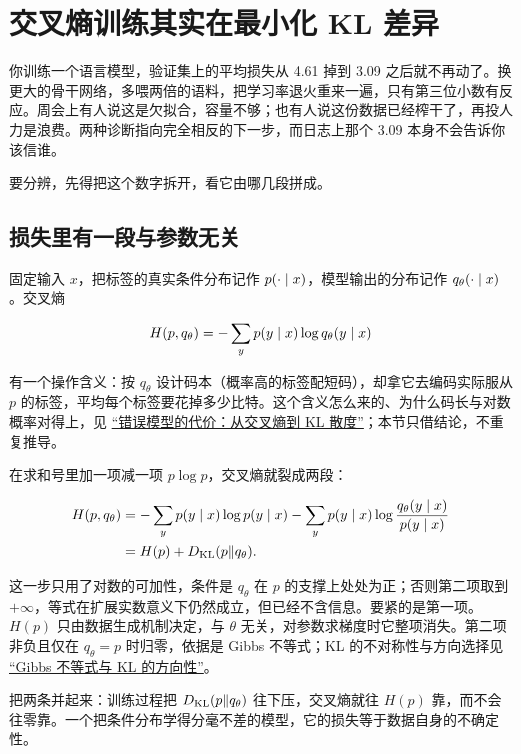 \section{交叉熵训练其实在最小化 KL 差异}
\label{sec:13-Machine-Learning/11-Information-Theoretic-Learning/01}

你训练一个语言模型，验证集上的平均损失从 4.61 掉到 3.09 之后就不再动了。换更大的骨干网络，多喂两倍的语料，把学习率退火重来一遍，只有第三位小数有反应。周会上有人说这是欠拟合，容量不够；也有人说这份数据已经榨干了，再投人力是浪费。两种诊断指向完全相反的下一步，而日志上那个 3.09 本身不会告诉你该信谁。

要分辨，先得把这个数字拆开，看它由哪几段拼成。

\subsection{损失里有一段与参数无关}

固定输入 \(x\)，把标签的真实条件分布记作 \(p(\cdot\mid x)\)，模型输出的分布记作 \(q_\theta(\cdot\mid x)\)。交叉熵

\[
H(p,q_\theta)=-\sum_y p(y\mid x)\log q_\theta(y\mid x)
\]

有一个操作含义：按 \(q_\theta\) 设计码本（概率高的标签配短码），却拿它去编码实际服从 \(p\) 的标签，平均每个标签要花掉多少比特。这个含义怎么来的、为什么码长与对数概率对得上，见 \hyperref[sec:07-Information-Theory/03-Divergences/01]{``错误模型的代价：从交叉熵到 KL 散度''}；本节只借结论，不重复推导。

在求和号里加一项减一项 \(p\log p\)，交叉熵就裂成两段：

\[
\begin{aligned}
H(p,q_\theta)
&=-\sum_y p(y\mid x)\log p(y\mid x)
 -\sum_y p(y\mid x)\log\frac{q_\theta(y\mid x)}{p(y\mid x)}\\
&=H(p)+D_{\mathrm{KL}}(p\|q_\theta).
\end{aligned}
\]

这一步只用了对数的可加性，条件是 \(q_\theta\) 在 \(p\) 的支撑上处处为正；否则第二项取到 \(+\infty\)，等式在扩展实数意义下仍然成立，但已经不含信息。要紧的是第一项。\(H(p)\) 只由数据生成机制决定，与 \(\theta\) 无关，对参数求梯度时它整项消失。第二项非负且仅在 \(q_\theta=p\) 时归零，依据是 Gibbs 不等式；KL 的不对称性与方向选择见 \hyperref[sec:07-Information-Theory/03-Divergences/02]{``Gibbs 不等式与 KL 的方向性''}。

把两条并起来：训练过程把 \(D_{\mathrm{KL}}(p\|q_\theta)\) 往下压，交叉熵就往 \(H(p)\) 靠，而不会往零靠。一个把条件分布学得分毫不差的模型，它的损失等于数据自身的不确定性。

